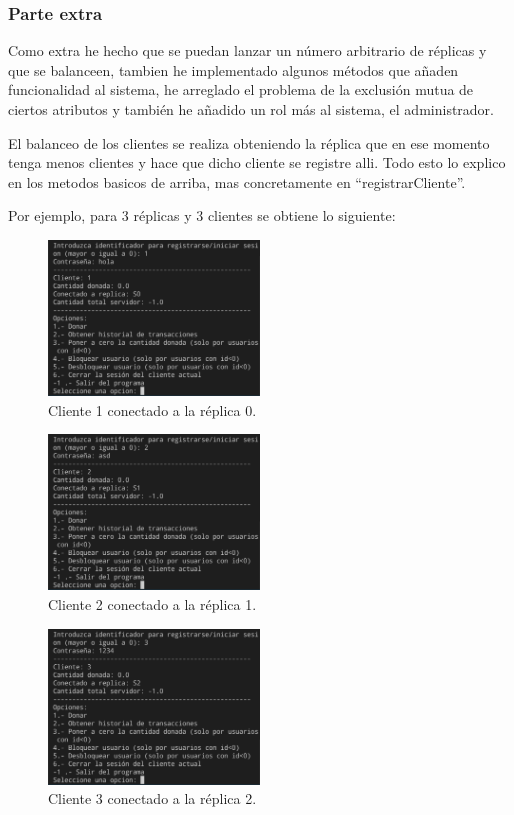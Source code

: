 \documentclass{article}
\begin{document}
\subsubsection{Parte extra}
Como extra he hecho que se puedan lanzar un número arbitrario de réplicas y que se balanceen, tambien he implementado algunos métodos que añaden funcionalidad al sistema, he arreglado el problema de la exclusión mutua de ciertos atributos y también he añadido un rol más al sistema, el administrador. 

El balanceo de los clientes se realiza obteniendo la réplica que en ese momento tenga menos clientes y hace que dicho cliente se registre alli. Todo esto lo explico en los metodos basicos de arriba, mas concretamente en ``registrarCliente''.

Por ejemplo, para 3 réplicas y 3 clientes se obtiene lo siguiente:
\begin{figure}[H]
    \centering
    \includegraphics[width=0.5\textwidth]{imagenes/3replicasS0.png}
    \caption{Cliente 1 conectado a la réplica 0.}
\end{figure}

\begin{figure}[H]
    \centering
    \includegraphics[width=0.5\textwidth]{imagenes/3replicasS1.png}
    \caption{Cliente 2 conectado a la réplica 1.}
\end{figure}

\begin{figure}[H]
    \centering
    \includegraphics[width=0.5\textwidth]{imagenes/3replicasS2.png}
    \caption{Cliente 3 conectado a la réplica 2.}
\end{figure}
\end{document}
